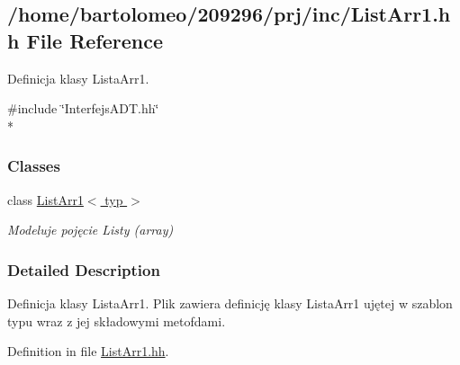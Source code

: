 \hypertarget{_list_arr1_8hh}{\subsection{/home/bartolomeo/209296/prj/inc/\-List\-Arr1.hh File Reference}
\label{_list_arr1_8hh}
}


Definicja klasy Lista\-Arr1.  


{\ttfamily \#include \char`\"{}Interfejs\-A\-D\-T.\-hh\char`\"{}}\\*
\subsubsection*{Classes}
\begin{DoxyCompactItemize}
\item 
class \hyperlink{class_list_arr1}{List\-Arr1$<$ typ $>$}
\begin{DoxyCompactList}\small\item\em Modeluje pojęcie Listy (array) \end{DoxyCompactList}\end{DoxyCompactItemize}


\subsubsection{Detailed Description}
Definicja klasy Lista\-Arr1. Plik zawiera definicję klasy Lista\-Arr1 ujętej w szablon typu wraz z jej składowymi metofdami. 

Definition in file \hyperlink{_list_arr1_8hh_source}{List\-Arr1.\-hh}.

